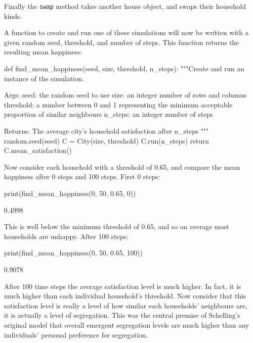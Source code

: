 Finally the \texttt{swap} method takes another house object, and
swaps their household kinds.

A function to create and run one of these simulations will now be written
with a given random seed, threshold, and number of steps. This function returns
the resulting mean happiness:

\begin{pyin}
def find_mean_happiness(seed, size, threshold, n_steps):
    """Create and run an instance of the simulation.

    Args:
        seed: the random seed to use
        size: an integer number of rows and columns
        threshold: a number between 0 and 1 representing
            the minimum acceptable proportion of similar
            neighbours
        n_steps: an integer number of steps

    Returns:
        The average city's household satisfaction after
        n_steps
    """
    random.seed(seed)
    C = City(size, threshold)
    C.run(n_steps)
    return C.mean_satisfaction()
\end{pyin}

Now consider each household with a threshold of
0.65, and compare the mean happiness after 0 steps and 100 steps.
First 0 steps:

\begin{pyin}
print(find_mean_happiness(0, 50, 0.65, 0))
\end{pyin}

\begin{pyout}
0.4998
\end{pyout}

This is well below the minimum threshold of \(0.65\), and so on average most
households are unhappy.
After 100 steps:

\begin{pyin}
print(find_mean_happiness(0, 50, 0.65, 100))
\end{pyin}

\begin{pyout}
0.9078
\end{pyout}

After 100 time steps the average satisfaction level is much higher.
In fact, it is much higher than each individual household's threshold.
Now consider that this satisfaction level is really a level of how similar
each households' neighbours are, it is actually a level of segregation.
This was the central premise of Schelling's original
model\autocite{schelling2006micromotives}
that overall
emergent segregation levels are much higher than any individuals' personal
preference for segregation.

